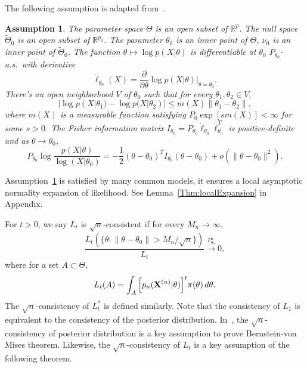 \documentclass[3p]{elsarticle}
\theoremstyle{plain}
\newtheorem{assumption}{\quad\quad Assumption}
\theoremstyle{definition}
\theoremstyle{remark}
\begin{document}
The following assumption is adapted from~\cite{Kleijn2012The}.
\begin{assumption}\label{Assumption1}
The parameter space $\Theta$ is an open subset of $\mathbb{R}^p$. 
    The null space $\tilde{\Theta}_0$ is an open subset of $\mathbb{R}^{p_0}$.
    The parameter $\theta_0$ is an inner point of $\Theta$, $\nu_0$ is an inner point of $\tilde{\Theta}_0$.
    The function $\theta \mapsto \log p(X|\theta)$ is differentiable at $\theta_0$  $P_{\theta_0}$-a.s.\ with derivative 
$$\dot{\ell}_{\theta_0}(X)=\frac{\partial}{\partial \theta}\log p(X|\theta)\Big|_{\theta=\theta_0}.$$
There's an open neighborhood $V$ of $\theta_0$ such that for every $\theta_1,\theta_2\in V$,
        \begin{equation*}
            |\log p(X|\theta_1)-\log p(X|\theta_2)|\leq m(X)\|\theta_1-\theta_2\|,
        \end{equation*}
        where $m(X)$ is a measurable function satisfying $P_{0}\exp[s m(X)]<\infty$ for some $s>0$.
        The Fisher information matrix $I_{\theta_0}=P_{\theta_0}\dot{\ell}_{\theta_0}\dot{\ell}_{\theta_0}^T$ is positive-definite and as $\theta\to \theta_0$,
    \begin{equation*}
        P_{\theta_0} \log \frac{p(X|\theta)}{ \log (X|\theta_0)}
        =-\frac{1}{2}(\theta-\theta_0)^T I_{\theta_0} (\theta-\theta_0)+o(\|\theta-\theta_0\|^2).
    \end{equation*}
\end{assumption}     
Assumption~\ref{Assumption1} is satisfied by many common models, it ensures a local asymptotic normality expansion of likelihood. See Lemma~\ref{Thm:localExpansion} in Appendix.

    For $t>0$, we say $L_t$ is $\sqrt{n}$-consistent if for every $M_n\to \infty$,
    $$
    \frac{L_t({\{\theta:\|\theta-\theta_0\|> M_n/\sqrt{n}\}})}{L_t}\xrightarrow{P_{\theta_0}^n} 0,
    $$
    where for a set $A\subset \Theta$,
$$
L_t (A)=\int_{A} \Big[ {p_n(\mathbf{X}^{(n)}|\theta)} \Big]^{t} \pi(\theta) \, d \theta.
$$
The $\sqrt{n}$-consistency of $L_t^*$ is defined similarly.
    Note that the consistency of $L_1$ is equivalent to the consistency of the posterior distribution.
    In~\cite{Kleijn2012The}, the $\sqrt{n}$-consistency of posterior distribution is a key assumption to prove Bernstein-von Mises theorem.
    Likewise, the $\sqrt{n}$-consistency of $L_t$ is a key assumption of the following theorem.
\end{document}
